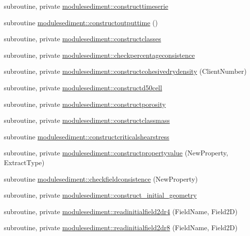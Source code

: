 \begin{DoxyCompactItemize}
\item 
subroutine, private \mbox{\hyperlink{namespacemodulesediment_aafc201d260f566a644259cfca436de86}{modulesediment\+::constructtimeserie}}
\item 
subroutine \mbox{\hyperlink{namespacemodulesediment_aacb4e3dc70adfbda3e0d8000b2088b3d}{modulesediment\+::constructoutputtime}} ()
\item 
subroutine, private \mbox{\hyperlink{namespacemodulesediment_aab617a4a3f8db9a8c86241473054067d}{modulesediment\+::constructclasses}}
\item 
subroutine, private \mbox{\hyperlink{namespacemodulesediment_ab89eafb956bc952759092de44da7a0b8}{modulesediment\+::checkpercentageconsistence}}
\item 
subroutine, private \mbox{\hyperlink{namespacemodulesediment_adc3a3328a47ba86ef363852158194846}{modulesediment\+::constructcohesivedrydensity}} (Client\+Number)
\item 
subroutine, private \mbox{\hyperlink{namespacemodulesediment_a595754027fca9b62be67b11dbad30185}{modulesediment\+::constructd50cell}}
\item 
subroutine, private \mbox{\hyperlink{namespacemodulesediment_a8ad0bd3e4a8a8ea6fb423df13967b877}{modulesediment\+::constructporosity}}
\item 
subroutine, private \mbox{\hyperlink{namespacemodulesediment_ae0fc128b081e1181c0df22dd4822b65d}{modulesediment\+::constructclassmass}}
\item 
subroutine \mbox{\hyperlink{namespacemodulesediment_a816e46154f7c824c75be6572b099e18a}{modulesediment\+::constructcriticalshearstress}}
\item 
subroutine, private \mbox{\hyperlink{namespacemodulesediment_a7df6a75fdbd4ab5caf95fe57492116fd}{modulesediment\+::constructpropertyvalue}} (New\+Property, Extract\+Type)
\item 
subroutine \mbox{\hyperlink{namespacemodulesediment_ade328a003b435bdea1339006c7c14db5}{modulesediment\+::checkfieldconsistence}} (New\+Property)
\item 
subroutine, private \mbox{\hyperlink{namespacemodulesediment_adb9b138d3feb285796bc8580b24509db}{modulesediment\+::construct\+\_\+initial\+\_\+geometry}}
\item 
subroutine, private \mbox{\hyperlink{namespacemodulesediment_a03d5ef49dd68eafdac5c93dab6c4e8de}{modulesediment\+::readinitialfield2dr4}} (Field\+Name, Field2D)
\item 
subroutine, private \mbox{\hyperlink{namespacemodulesediment_a260a1cba073b46d204c52ec103eb9f30}{modulesediment\+::readinitialfield2dr8}} (Field\+Name, Field2D)

\end{DoxyCompactItemize}
